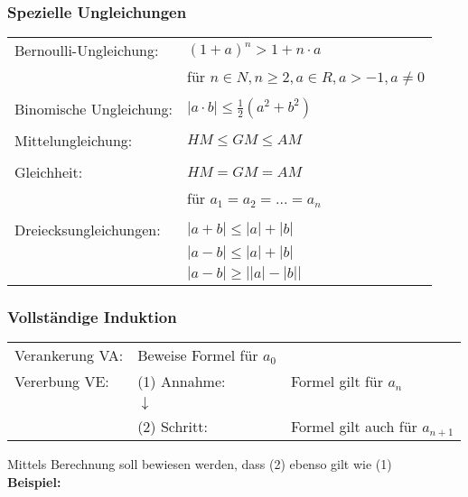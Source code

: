 \subsubsection{Spezielle Ungleichungen}
    \begin{tabular}{ll} 
        Bernoulli-Ungleichung: & $(1 + a)^n > 1 + n \cdot a$\\
                               & für $n \in N, n \geq 2, a \in R, a > -1, a\neq0$ \\
        \\
        Binomische Ungleichung: & $|a\cdot b|\leq\frac{1}{2}(a^2 + b^2)$\\ 
        \\
        Mittelungleichung: & $ HM \leq GM \leq AM $\\
        \\
        Gleichheit: & $ HM = GM = AM$ \\
                    & für $a_1 = a_2 = ... = a_n$ \\
        \\
        Dreiecksungleichungen: & $\left|a+b\right|\leq\left|a\right|+\left|b\right|$ \\
                               & 	$\left|a-b\right|\leq\left|a\right|+\left|b\right|$  \\
                               & $\left|a-b\right|\geq\left|\left|a\right|-\left|b\right|\right|$ \\
    \end{tabular}
        
\subsubsection{Vollständige Induktion}	
    \begin{tabular}{lll} 
        Verankerung VA: & Beweise Formel für $a_0$ & \\
        Vererbung VE:   & (1) Annahme: & Formel gilt für $a_n$ \\
                        & $\downarrow$ & \\
                        & (2) Schritt: & Formel gilt auch für $a_{n+1}$ \\
    \end{tabular}
        
    Mittels Berechnung soll bewiesen werden, dass (2) ebenso gilt wie (1) \\

    \textbf{Beispiel:} \\
    
